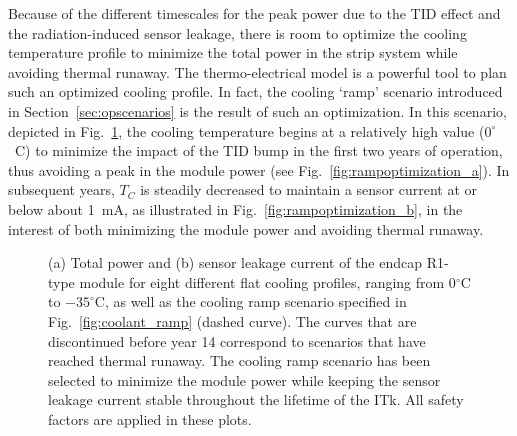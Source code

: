Because of the different timescales for the peak power due to the TID effect and the radiation-induced sensor leakage, there is room to optimize the cooling temperature profile to minimize the total power in the strip system while avoiding thermal runaway. The thermo-electrical model is a powerful tool to plan such an optimized cooling profile. In fact, the cooling `ramp' scenario introduced in Section~\ref{sec:opscenarios} is the result of such an optimization.
In this scenario, depicted in Fig.~\ref{fig:rampoptimization}, the cooling temperature begins at a relatively high value ($0^\circ$~C) to minimize the impact of the TID bump in the first two years of operation, thus avoiding a peak in the module power (see Fig.~\ref{fig:rampoptimization_a}). In subsequent years, $T_C$ is steadily decreased to maintain a sensor current at or below about 1~mA, as illustrated in Fig.~\ref{fig:rampoptimization_b}, in the interest of both minimizing the module power and avoiding thermal runaway.

\begin{figure}[ht]
\centering
{}\quad\quad
{}
\caption{(a) Total power and (b) sensor leakage current of the endcap R1-type module for eight different flat cooling profiles, ranging from 0$^\circ$C to $-35^\circ$C, as well as the cooling ramp scenario specified in Fig.~\ref{fig:coolant_ramp} (dashed curve). The curves that are discontinued before year 14 correspond to scenarios that have reached thermal runaway. The cooling ramp scenario has been selected to minimize the module power while keeping the sensor leakage current stable throughout the lifetime of the ITk. All safety factors are applied in these plots.}
\label{fig:rampoptimization}
\end{figure}
